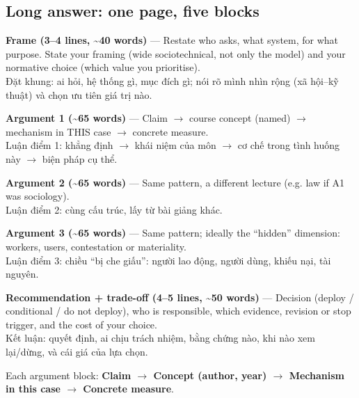 \documentclass[11pt,a4paper]{article}
\newcommand{\vitext}[1]{{\small\color{tipc}#1}}
\newcommand{\blk}[1]{{\setlength{\fboxsep}{2pt}\colorbox{ink}{\sffamily\footnotesize\bfseries\color{white}\,#1\,}}}
\begin{document}
\subsection*{Long answer: one page, five blocks}\begin{description}[leftmargin=1.2cm,style=nextline]
\item[\blk{F}] \textbf{Frame (3–4 lines, \textasciitilde{}40 words)} — Restate who asks, what system, for what purpose. State your framing (wide sociotechnical, not only the model) and your normative choice (which value you prioritise).\\\vitext{Đặt khung: ai hỏi, hệ thống gì, mục đích gì; nói rõ mình nhìn rộng (xã hội–kỹ thuật) và chọn ưu tiên giá trị nào.}
\item[\blk{A1}] \textbf{Argument 1 (\textasciitilde{}65 words)} — Claim $\rightarrow$ course concept (named) $\rightarrow$ mechanism in THIS case $\rightarrow$ concrete measure.\\\vitext{Luận điểm 1: khẳng định $\rightarrow$ khái niệm của môn $\rightarrow$ cơ chế trong tình huống này $\rightarrow$ biện pháp cụ thể.}
\item[\blk{A2}] \textbf{Argument 2 (\textasciitilde{}65 words)} — Same pattern, a different lecture (e.g. law if A1 was sociology).\\\vitext{Luận điểm 2: cùng cấu trúc, lấy từ bài giảng khác.}
\item[\blk{A3}] \textbf{Argument 3 (\textasciitilde{}65 words)} — Same pattern; ideally the “hidden” dimension: workers, users, contestation or materiality.\\\vitext{Luận điểm 3: chiều “bị che giấu”: người lao động, người dùng, khiếu nại, tài nguyên.}
\item[\blk{R}] \textbf{Recommendation + trade-off (4–5 lines, \textasciitilde{}50 words)} — Decision (deploy / conditional / do not deploy), who is responsible, which evidence, revision or stop trigger, and the cost of your choice.\\\vitext{Kết luận: quyết định, ai chịu trách nhiệm, bằng chứng nào, khi nào xem lại/dừng, và cái giá của lựa chọn.}
\end{description}Each argument block: \textbf{Claim $\rightarrow$ Concept (author, year) $\rightarrow$ Mechanism in this case $\rightarrow$ Concrete measure}.
\end{document}

